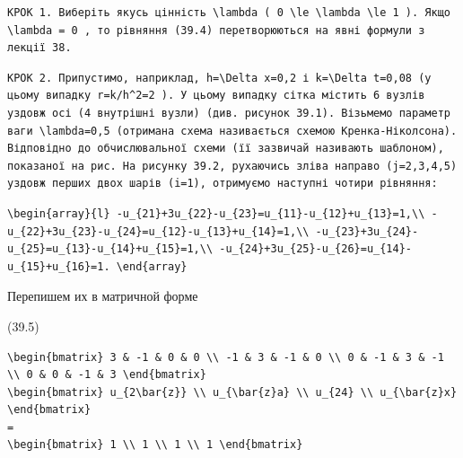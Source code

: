 \documentclass[
  ukrainian,
]{article}
\begin{document}
\begin{verbatim}
КРОК 1. Виберіть якусь цінність \lambda ( 0 \le \lambda \le 1 ). Якщо \lambda = 0 , то рівняння (39.4) перетворюються на явні формули з лекції 38.
\end{verbatim}

\begin{verbatim}
КРОК 2. Припустимо, наприклад, h=\Delta x=0,2 і k=\Delta t=0,08 (у цьому випадку r=k/h^2=2 ). У цьому випадку сітка містить 6 вузлів уздовж осі (4 внутрішні вузли) (див. рисунок 39.1). Візьмемо параметр ваги \lambda=0,5 (отримана схема називається схемою Кренка-Ніколсона). Відповідно до обчислювальної схеми (її зазвичай називають шаблоном), показаної на рис. На рисунку 39.2, рухаючись зліва направо (j=2,3,4,5) уздовж перших двох шарів (i=1), отримуємо наступні чотири рівняння:
\end{verbatim}

\begin{verbatim}
\begin{array}{l} -u_{21}+3u_{22}-u_{23}=u_{11}-u_{12}+u_{13}=1,\\ -u_{22}+3u_{23}-u_{24}=u_{12}-u_{13}+u_{14}=1,\\ -u_{23}+3u_{24}-u_{25}=u_{13}-u_{14}+u_{15}=1,\\ -u_{24}+3u_{25}-u_{26}=u_{14}-u_{15}+u_{16}=1. \end{array}
\end{verbatim}

Перепишем их в матричной форме

(39.5)

\begin{verbatim}
\begin{bmatrix} 3 & -1 & 0 & 0 \\ -1 & 3 & -1 & 0 \\ 0 & -1 & 3 & -1 \\ 0 & 0 & -1 & 3 \end{bmatrix}
\begin{bmatrix} u_{2\bar{z}} \\ u_{\bar{z}a} \\ u_{24} \\ u_{\bar{z}x} \end{bmatrix}
=
\begin{bmatrix} 1 \\ 1 \\ 1 \\ 1 \end{bmatrix}
\end{verbatim}
\end{document}
